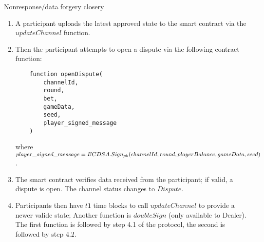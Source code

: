 \begin{algorithm}[H]
\caption{Nonresponse/data forgery closery} \label{alg:close4}
\begin{enumerate}
	\item A participant uploads the latest approved state to the smart contract via the $updateChannel$ function.
	\item Then the participant attempts to open a dispute via the following contract function:
\begin{lstlisting}
    function openDispute(
        channelId,
        round,
        bet,
        gameData,
        seed,
        player_signed_message
    )
\end{lstlisting}
where $player\_signed\_message = ECDSA.Sign_{pk}(channelId, round, \\ playerBalance, gameData, seed)$.
	\item The smart contract verifies data received from the participant; if valid, a dispute is open. The channel status changes to $Dispute$.
	\item  Participants then have $t1$ time blocks to call $updateChannel$ to provide a newer valide state; Another function is  $doubleSign$ (only available to Dealer). The first function is followed by step 4.1 of the protocol, the second is followed by step 4.2.
\end{enumerate}
\end{algorithm}
